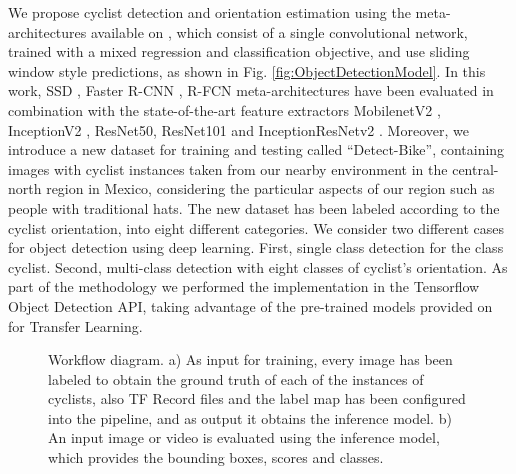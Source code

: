 \documentclass[journal]{IEEEtran}
\begin{document}
We propose cyclist detection and orientation estimation using the meta-architectures available on \cite{huang2017speed}, which consist of a single convolutional network, trained with a mixed regression and classification objective, and use sliding window style predictions, as shown in Fig. \ref{fig:ObjectDetectionModel}. In this work,  SSD \cite{liu2016ssd}, Faster R-CNN \cite{fasterObject2015}, R-FCN \cite{dai2016r} meta-architectures have been evaluated in combination with the state-of-the-art feature extractors MobilenetV2 \cite{sandler2018mobilenetv2}, InceptionV2 \cite{szegedy2016re},  ResNet50, ResNet101 \cite{he2016deep} and InceptionResNetv2 \cite{szegedy2017inception}. Moreover, we introduce a new dataset for training and testing called ``Detect-Bike'', containing images with cyclist instances taken from our nearby environment in the central-north region in Mexico, considering the particular aspects of our region such as people with traditional hats. The new dataset has been labeled according to the cyclist orientation, into eight different categories. We consider two different cases for object detection using deep learning. First, single class detection for the class cyclist. Second, multi-class detection with eight classes of cyclist's orientation.  As part of the methodology we performed the implementation in the Tensorflow Object Detection API, taking advantage of the pre-trained models provided on \cite{TensorFlow2019} for Transfer Learning.

\begin{figure}[t!]
\begin{center}
    \newline
 \caption{Workflow diagram. a) As input for training, every image has been labeled to obtain the ground truth of each of the instances of cyclists, also TF Record files and the label map has been configured into the pipeline, and as output it obtains the inference model. b) An input image or video is evaluated using the inference model, which provides the bounding boxes, scores and classes.}
 \label{fig:SystemOverview}
\end{center}
\end{figure}
\end{document}
